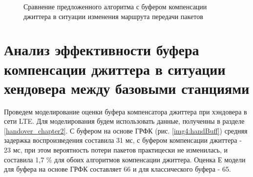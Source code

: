 \pgfplotsset{width=15cm, height=10cm, compat=1.3}
\begin{figure} [!h]
  \center
{}
\caption{Сравнение предложенного алгоритма с буфером компенсации джиттера \cite{Ramjee} в ситуации изменения маршрута передачи пакетов}
  \label{img4:routeBuff}
\end{figure}


\clearpage
















\section{Анализ эффективности буфера компенсации джиттера в ситуации хендовера между базовыми станциями} \label{sect4}


Проведем моделирование оценки буфера компенсатора джиттера при хэндовера в сети LTE. Для моделирования будем использовать данные, полученны в разделе \ref{handover_chapter2}. С буфером на основе ГРФК (рис. \ref{img4:handBuff}) средняя задержка воспроизведения составила 31 мс, с буфером компенсации джиттера \cite{Ramjee} - 23 мс, при этом вероятность потери пакетов практицески не изменилась, и составила 1,7 \% для обоих алгоритмов компенсации джиттера. Оценка Е модели для буфера на основе ГРФК составляет 66 и для классического буфера - 65.


